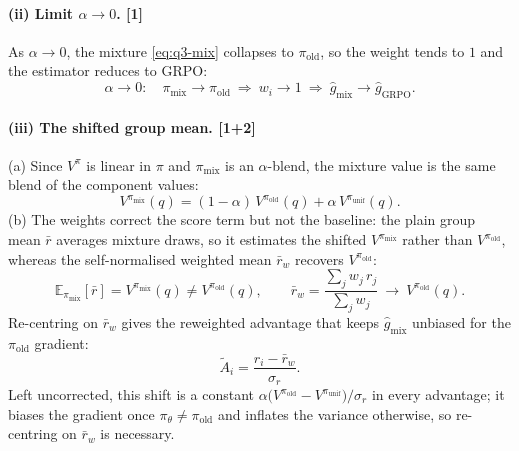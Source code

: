 \documentclass[11pt,a4paper]{article}
\begin{document}
\paragraph{(ii) Limit $\alpha\to0$. \hfill\textnormal{[1]}}
As $\alpha\to0$, the mixture \eqref{eq:q3-mix} collapses to $\pi_{\mathrm{old}}$, so the weight tends to $1$ and the estimator reduces to GRPO:
\begin{equation}
  \alpha\to0:\quad \pi_{\mathrm{mix}}\to\pi_{\mathrm{old}}\ \Longrightarrow\ w_i\to1
  \ \Longrightarrow\ \hat g_{\mathrm{mix}}\to\hat g_{\mathrm{GRPO}}.
  \label{eq:q3-limit}
\end{equation}

\paragraph{(iii) The shifted group mean. \hfill\textnormal{[1+2]}}
(a) Since $V^{\pi}$ is linear in $\pi$ and $\pi_{\mathrm{mix}}$ is an $\alpha$-blend, the mixture value is the same blend of the component values:
\begin{equation}
  V^{\pi_{\mathrm{mix}}}(q)=(1-\alpha)\,V^{\pi_{\mathrm{old}}}(q)+\alpha\,V^{\pi_{\mathrm{unif}}}(q).
  \label{eq:q3-vmix}
\end{equation}
(b) The weights correct the score term but not the baseline: the plain group mean $\bar r$ averages
mixture draws, so it estimates the shifted $V^{\pi_{\mathrm{mix}}}$ rather than $V^{\pi_{\mathrm{old}}}$,
whereas the self-normalised weighted mean $\bar r_w$ recovers $V^{\pi_{\mathrm{old}}}$:
\begin{equation}
  \mathbb{E}_{\pi_{\mathrm{mix}}}[\bar r]=V^{\pi_{\mathrm{mix}}}(q)\neq V^{\pi_{\mathrm{old}}}(q),
  \qquad
  \bar r_w=\frac{\sum_{j} w_j\,r_j}{\sum_{j} w_j}\ \longrightarrow\ V^{\pi_{\mathrm{old}}}(q).
  \label{eq:q3-baseline}
\end{equation}
Re-centring on $\bar r_w$ gives the reweighted advantage that keeps $\hat g_{\mathrm{mix}}$ unbiased for the $\pi_{\mathrm{old}}$ gradient:
\begin{equation}
  \tilde A_i=\frac{r_i-\bar r_w}{\sigma_r}.
  \label{eq:q3-Atilde}
\end{equation}
Left uncorrected, this shift is a constant $\alpha\bigl(V^{\pi_{\mathrm{old}}}-V^{\pi_{\mathrm{unif}}}\bigr)/\sigma_r$ in
every advantage; it biases the gradient once $\pi_\theta\neq\pi_{\mathrm{old}}$ and inflates the variance
otherwise, so re-centring on $\bar r_w$ is necessary.
\end{document}
